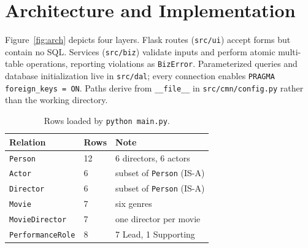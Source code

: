 \documentclass[sigconf,nonacm]{acmart}
\newcommand{\tn}[1]{\texttt{#1}}
\begin{document}
\section{Architecture and Implementation}
Figure~\ref{fig:arch} depicts four layers. Flask routes (\tn{src/ui}) accept forms but contain no SQL. Services (\tn{src/biz}) validate inputs and perform atomic multi-table operations, reporting violations as \tn{BizError}. Parameterized queries and database initialization live in \tn{src/dal}; every connection enables \tn{PRAGMA foreign\_keys = ON}. Paths derive from \tn{\_\_file\_\_} in \tn{src/cmn/config.py} rather than the working directory.

\begin{table}[t]
\caption{Rows loaded by \tn{python main.py}.}\label{tab:rows}
\small\begin{tabular}{@{}llp{1.45in}@{}}\toprule
\textbf{Relation} & \textbf{Rows} & \textbf{Note}\\\midrule
\tn{Person} & 12 & 6 directors, 6 actors\\
\tn{Actor} & 6 & subset of \tn{Person} (IS-A)\\
\tn{Director} & 6 & subset of \tn{Person} (IS-A)\\
\tn{Movie} & 7 & six genres\\
\tn{MovieDirector} & 7 & one director per movie\\
\tn{PerformanceRole} & 8 & 7 Lead, 1 Supporting\\\bottomrule
\end{tabular}
\end{table}
\end{document}
